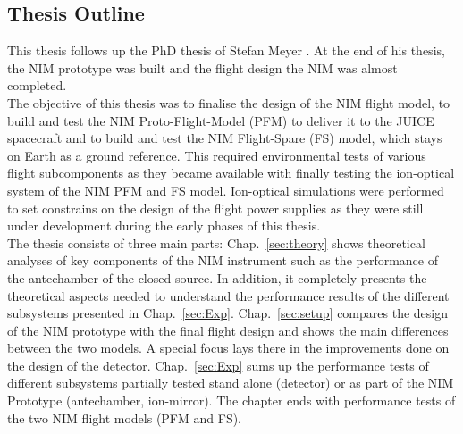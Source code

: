 	\subsection{Thesis Outline}
	This thesis follows up the PhD thesis of Stefan Meyer \cite{Diss_Meyer}. At the end of his thesis, the NIM prototype was built and the flight design the NIM was almost completed.\\	
	The objective of this thesis was to finalise the design of the NIM flight model, to build and test the NIM Proto-Flight-Model (PFM) to deliver it to the JUICE spacecraft and to build and test the NIM Flight-Spare (FS) model, which stays on Earth as a ground reference. This required environmental tests of various flight subcomponents as they became available with finally testing the ion-optical system of the NIM PFM and FS model. Ion-optical simulations were performed to set constrains on the design of the flight power supplies as they were still under development during the early phases of this thesis.\\
	The thesis consists of three main parts: Chap.~\ref{sec:theory} shows theoretical analyses of key components of the NIM instrument such as the performance of the antechamber of the closed source. In addition, it completely presents the theoretical aspects needed to understand the performance results of the different subsystems presented in Chap.~\ref{sec:Exp}. Chap.~\ref{sec:setup} compares the design of the NIM prototype with the final flight design and shows the main differences between the two models. A special focus lays there in the improvements done on the design of the detector. Chap.~\ref{sec:Exp} sums up the performance tests of different subsystems partially tested stand alone (detector) or as part of the NIM Prototype (antechamber, ion-mirror). The chapter ends with performance tests of the two NIM flight models (PFM and FS).
	
	
	
	
	
	
	
	
	
	
	
	